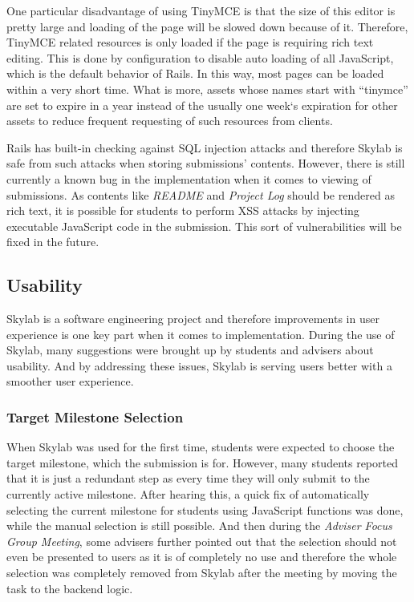 One particular disadvantage of using TinyMCE is that the size of this editor is pretty large and loading of the page will be slowed down because of it. Therefore, TinyMCE related resources is only loaded if the page is requiring rich text editing. This is done by configuration to disable auto loading of all JavaScript, which is the default behavior of Rails. In this way, most pages can be loaded within a very short time. What is more, assets whose names start with ``tinymce'' are set to expire in a year instead of the usually one week`s expiration for other assets to reduce frequent requesting of such resources from clients.

Rails has built-in checking against SQL injection attacks and therefore Skylab is safe from such attacks when storing submissions' contents\cite{citationrorsecurity}. However, there is still currently a known bug in the implementation when it comes to viewing of submissions. As contents like \textit{README} and \textit{Project Log} should be rendered as rich text, it is possible for students to perform XSS attacks by injecting executable JavaScript code in the submission. This sort of vulnerabilities will be fixed in the future.

\subsection{Usability}

Skylab is a software engineering project and therefore improvements in user experience is one key part when it comes to implementation. During the use of Skylab, many suggestions were brought up by students and advisers about usability. And by addressing these issues, Skylab is serving users better with a smoother user experience.

\subsubsection{Target Milestone Selection}

When Skylab was used for the first time, students were expected to choose the target milestone, which the submission is for. However, many students reported that it is just a redundant step as every time they will only submit to the currently active milestone. After hearing this, a quick fix of automatically selecting the current milestone for students using JavaScript functions was done, while the manual selection is still possible. And then during the \textit{Adviser Focus Group Meeting}, some advisers further pointed out that the selection should not even be presented to users as it is of completely no use and therefore the whole selection was completely removed from Skylab after the meeting by moving the task to the backend logic. 

